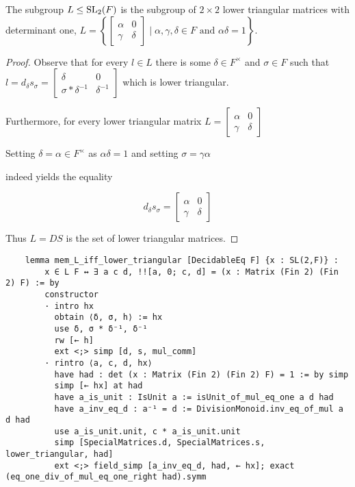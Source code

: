 \begin{corollary}
    \label{mem_L_iff_lower_triangular}
    \leanok
    The subgroup $L \le \operatorname{SL}_2(F)$ is the subgroup of $2 \times 2$ lower triangular matrices with determinant one, $L =\left\{\begin{bmatrix}
    \alpha & 0\\
    \gamma & \delta
    \end{bmatrix} \; | \; \alpha, \gamma, \delta \in F \text{ and } \alpha \delta = 1 \right\}$.
\end{corollary}
\begin{proof}
\leanok
    Observe that for every $l \in L$ there is some $\delta \in F^\times$ and $\sigma \in F$ such that $l  = d_\delta s_\sigma = \begin{bmatrix}
        \delta & 0\\
        \sigma * \delta^{-1} & \delta^{-1}
    \end{bmatrix}$ which is lower triangular. 
    
    Furthermore, for every lower triangular matrix $L = \begin{bmatrix}
        \alpha & 0\\
        \gamma & \delta
    \end{bmatrix}$ 
    
    Setting $\delta = \alpha \in F^\times$ as $\alpha \delta = 1$ and setting $\sigma = \gamma \alpha$

    indeed yields the equality

    \[
    d_\delta s_\sigma = \begin{bmatrix}
        \alpha & 0\\
        \gamma & \delta
    \end{bmatrix}
    \]

    Thus $L = D S$ is the set of lower triangular matrices.
\end{proof}
\begin{footnotesize}
    \begin{verbatim}
    lemma mem_L_iff_lower_triangular [DecidableEq F] {x : SL(2,F)} :
        x ∈ L F ↔ ∃ a c d, !![a, 0; c, d] = (x : Matrix (Fin 2) (Fin 2) F) := by
        constructor
        · intro hx
          obtain ⟨δ, σ, h⟩ := hx
          use δ, σ * δ⁻¹, δ⁻¹
          rw [← h]
          ext <;> simp [d, s, mul_comm]
        · rintro ⟨a, c, d, hx⟩
          have had : det (x : Matrix (Fin 2) (Fin 2) F) = 1 := by simp
          simp [← hx] at had
          have a_is_unit : IsUnit a := isUnit_of_mul_eq_one a d had
          have a_inv_eq_d : a⁻¹ = d := DivisionMonoid.inv_eq_of_mul a d had
          use a_is_unit.unit, c * a_is_unit.unit
          simp [SpecialMatrices.d, SpecialMatrices.s, lower_triangular, had]
          ext <;> field_simp [a_inv_eq_d, had, ← hx]; exact (eq_one_div_of_mul_eq_one_right had).symm
    \end{verbatim}
    \end{footnotesize}

